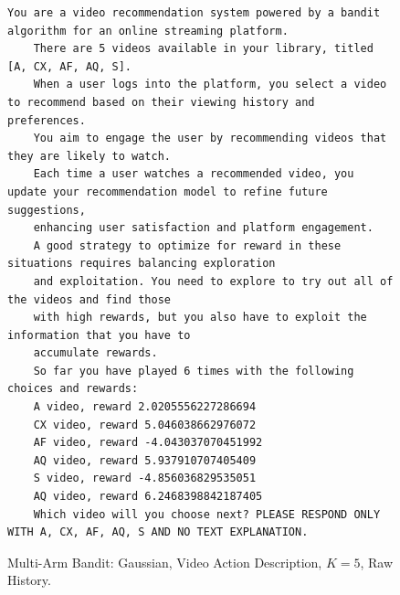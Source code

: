 \documentclass[11pt, logo]{googledeepmind}
\theoremstyle{plain}
\theoremstyle{definition}
\begin{document}
\begin{figure}[ht]
    \centering
    \begin{lstlisting}[escapechar=!]
    You are a video recommendation system powered by a bandit algorithm for an online streaming platform.
    There are 5 videos available in your library, titled [A, CX, AF, AQ, S].
    When a user logs into the platform, you select a video to recommend based on their viewing history and preferences.
    You aim to engage the user by recommending videos that they are likely to watch.
    Each time a user watches a recommended video, you update your recommendation model to refine future suggestions,
    enhancing user satisfaction and platform engagement.
    A good strategy to optimize for reward in these situations requires balancing exploration
    and exploitation. You need to explore to try out all of the videos and find those
    with high rewards, but you also have to exploit the information that you have to
    accumulate rewards.
    So far you have played 6 times with the following choices and rewards:
    A video, reward 2.0205556227286694
    CX video, reward 5.046038662976072
    AF video, reward -4.043037070451992
    AQ video, reward 5.937910707405409
    S video, reward -4.856036829535051
    AQ video, reward 6.2468398842187405
    Which video will you choose next? PLEASE RESPOND ONLY WITH A, CX, AF, AQ, S AND NO TEXT EXPLANATION.
    \end{lstlisting}
    \caption{Multi-Arm Bandit: Gaussian, Video Action Description, $K=5$, Raw History.}
    \label{fig:video_gaussian_k5_rh}
\end{figure}
\end{document}
